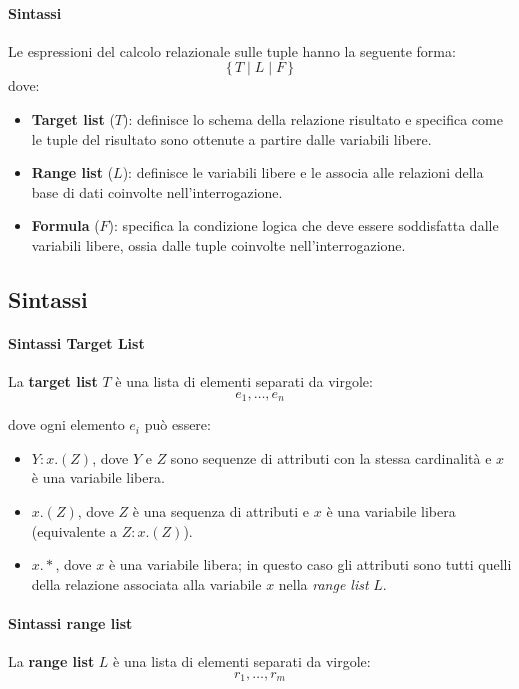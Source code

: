 \paragraph{Sintassi}
Le espressioni del calcolo relazionale sulle tuple hanno la seguente forma:
\[
\{\, T \mid L \mid F \,\}
\]
dove:
\begin{itemize}
	\item \textbf{Target list} ($T$): definisce lo schema della relazione risultato e specifica come le tuple del risultato sono ottenute a partire dalle variabili libere.
	
	\item \textbf{Range list} ($L$): definisce le variabili libere e le associa alle relazioni della base di dati coinvolte nell’interrogazione.
	
	\item \textbf{Formula} ($F$): specifica la condizione logica che deve essere soddisfatta dalle variabili libere, ossia dalle tuple coinvolte nell’interrogazione.
\end{itemize}
\subsection{Sintassi}
\paragraph{Sintassi Target List}
La \textbf{target list} $T$ è una lista di elementi separati da virgole:
\[
e_1, \ldots, e_n
\]

dove ogni elemento $e_i$ può essere:
\begin{itemize}
	\item $Y : x.(Z)$,  
	dove $Y$ e $Z$ sono sequenze di attributi con la stessa cardinalità e $x$ è una variabile libera.
	
	\item $x.(Z)$,  
	dove $Z$ è una sequenza di attributi e $x$ è una variabile libera (equivalente a $Z : x.(Z)$).
	
	\item $x.*$,  
	dove $x$ è una variabile libera; in questo caso gli attributi sono tutti quelli della relazione associata alla variabile $x$ nella \emph{range list} $L$.
\end{itemize}
\paragraph{Sintassi range list}
La \textbf{range list} $L$ è una lista di elementi separati da virgole:
\[
r_1, \ldots, r_m
\]

